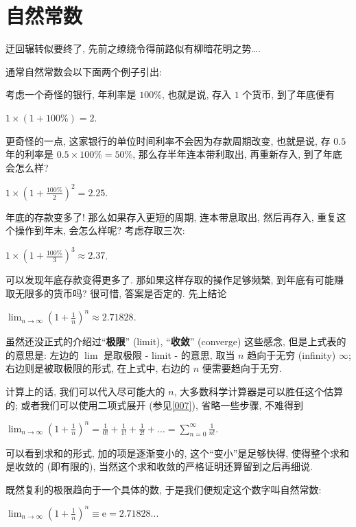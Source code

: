 \section{自然常数}\label{008}

\begin{flushright}{\kaishu 迂回辗转似要终了, 先前之缭绕令得前路似有柳暗花明之势\ldots.}\end{flushright}

通常自然常数会以下面两个例子引出:

\begin{tcolorbox}[size=fbox, breakable, enhanced jigsaw, title={复利}]

考虑一个奇怪的银行, 年利率是 $100\%$, 也就是说, 存入 $1$ 个货币,
到了年底便有

$1\times(1+100\%)=2.$

更奇怪的一点, 这家银行的单位时间利率不会因为存款周期改变, 也就是说, 存
$0.5$ 年的利率是 $0.5\times100\%=50\%$, 那么存半年连本带利取出,
再重新存入, 到了年底会怎么样?

$1\times\left(1+\frac{100\%}{2}\right)^2=2.25.$

年底的存款变多了! 那么如果存入更短的周期, 连本带息取出, 然后再存入,
重复这个操作到年末, 会怎么样呢? 考虑存取三次:

$1\times\left(1+\frac{100\%}{3}\right)^3\approx2.37$.

可以发现年底存款变得更多了. 那如果这样存取的操作足够频繁,
到年底有可能赚取无限多的货币吗? 很可惜, 答案是否定的. 先上结论

$\lim_{n\rightarrow\infty}\left(1+\frac{1}{n}\right)^n\approx2.71828.$

虽然还没正式的介绍过``\textbf{极限}'' (limit), ``\textbf{收敛}''
(converge) 这些感念, 但是上式表的的意思是: 左边的 $\lim$ 是取极限 -
limit - 的意思, 取当 $n$ 趋向于无穷 (infinity) $\infty$;
右边则是被取极限的形式, 在上式中, 右边的 $n$ 便需要趋向于无穷.

计算上的话, 我们可以代入尽可能大的 $n$,
大多数科学计算器是可以胜任这个估算的; 或者我们可以使用二项式展开
(参见\ref{007}), 省略一些步骤, 不难得到

$\lim_{n\rightarrow\infty}\left(1+\frac{1}{n}\right)^n=\frac{1}{0!}+\frac{1}{1!}+\frac{1}{2!}+...=\sum_{n=0}^\infty\frac{1}{n!}.$

可以看到求和的形式, 加的项是逐渐变小的, 这个``变小''是足够快得,
使得整个求和是收敛的 (即有限的),
当然这个求和收敛的严格证明还算留到之后再细说.

既然复利的极限趋向于一个具体的数, 于是我们便规定这个数字叫自然常数:

$\boxed{\lim_{n\rightarrow\infty}\left(1+\frac{1}{n}\right)^n\equiv\mathrm{e}=2.71828...}$

\end{tcolorbox}

